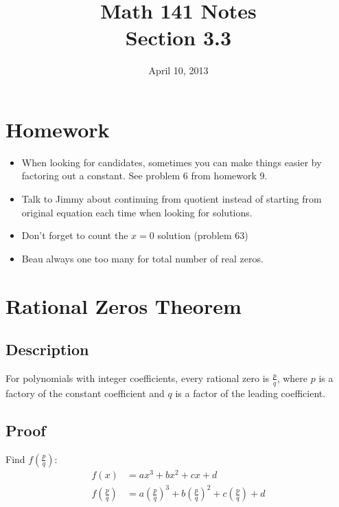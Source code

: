 \documentclass{exam}
\title{Math 141 Notes \\ Section 3.3}
\date{April 10, 2013}
\begin{document}
  \maketitle
  \tableofcontents

  \pagebreak

  \section{Homework}
  \begin{itemize}
    \item When looking for candidates, sometimes you can make things easier by factoring out a constant.  See problem 6
      from homework 9.

    \item Talk to Jimmy about continuing from quotient instead of starting from original equation each time when looking
      for solutions.

    \item Don't forget to count the $x = 0$ solution (problem 63)

    \item Beau always one too many for total number of real zeros.
  \end{itemize}

  \section{Rational Zeros Theorem}

  \subsection{Description}
  For polynomials with integer coefficients, every rational zero is $\frac{p}{q}$, where $p$ is a factory of the constant
  coefficient and $q$ is a factor of the leading coefficient.

  \subsection{Proof}

  Find $f \left( \frac{p}{q} \right)$:
  \begin{align*}
    f(x)                         &= ax^3 + bx^2 + cx + d \\
    f \left( \frac{p}{q} \right) &= a \left( \frac{p}{q} \right)^3 + b \left( \frac{p}{q} \right)^2 + c \left( \frac{p}{q} \right) + d \\
  \end{align*}
\end{document}

